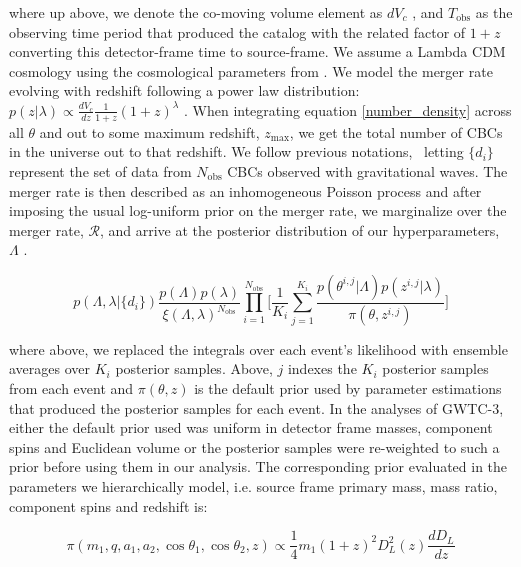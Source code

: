 \noindent
where up above, we denote the co-moving volume element as $dV_c$ \citep{hogg_cosmo}, and $T_\mathrm{obs}$ as the observing time period that produced the 
catalog with the related factor of $1+z$ converting this detector-frame time to source-frame. We assume a Lambda CDM cosmology using 
the cosmological parameters from \citet{Planck2015}. We model the merger rate evolving with redshift following a power law distribution: 
$p(z|\lambda) \propto \frac{dV_c}{dz}\frac{1}{1+z}(1+z)^\lambda$ \citep{Fishbach_2018redshift}. When integrating equation \ref{number_density} across all $\theta$
and out to some maximum redshift, $z_\mathrm{max}$, we get the total number of CBCs in the universe out to that redshift. We follow previous notations, \
letting $\{d_i\}$ represent the set of data from $N_\mathrm{obs}$ CBCs observed with gravitational waves. The merger rate is then described as an inhomogeneous 
Poisson process and after imposing the usual log-uniform prior on the merger rate, we marginalize over the merger rate, $\mathcal{R}$, and arrive at the posterior
distribution of our hyperparameters, $\Lambda$ \citep{Mandel_2019, Vitale_2021}.

\begin{equation}
    p\left(\Lambda, \lambda | \{d_i\}\right) \frac{p(\Lambda)p(\lambda)}{\xi(\Lambda,\lambda)^{N_\mathrm{obs}}} \prod_{i=1}^{N_\mathrm{obs}} \bigg[ \frac{1}{K_i} \sum_{j=1}^{K_i} \frac{p(\theta^{i,j}|\Lambda)p(z^{i,j}|\lambda)}{\pi(\theta, z^{i,j})} \bigg]
\end{equation}

\noindent
where above, we replaced the integrals over each event's likelihood with ensemble averages over $K_i$ posterior samples. Above, $j$
indexes the $K_i$ posterior samples from each event and $\pi(\theta, z)$ is the default prior used by parameter estimations that 
produced the posterior samples for each event. In the analyses of GWTC-3, either the default prior used was uniform in detector frame masses, 
component spins and Euclidean volume or the posterior samples were re-weighted to such a prior before using them in our analysis. 
The corresponding prior evaluated in the parameters we hierarchically model, i.e. source frame primary mass, mass ratio, component spins and redshift is:

\begin{equation}
    \pi(m_1, q, a_1, a_2, \cos{\theta_1}, \cos{\theta_2}, z) \propto \frac{1}{4} m_1 (1+z)^2 D_L^2(z) \frac{dD_L}{dz}
\end{equation}

